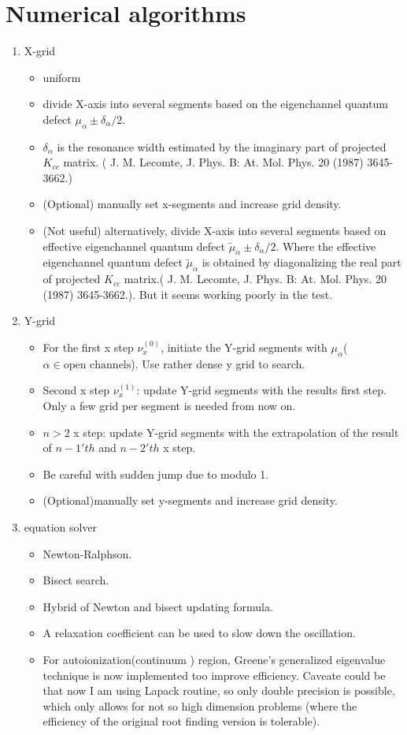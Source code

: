 \documentclass[11pt]{article}
\begin{document}
\section{\label{sec:numerical}Numerical algorithms}
\begin{enumerate}
\item X-grid
\begin{itemize}
	\item uniform 
	\item divide X-axis into several segments based on the eigenchannel quantum defect $\mu_{\alpha}\pm \delta_{\alpha}/2$.
	\item $\delta_{\alpha}$ is the resonance width estimated by the imaginary part of projected $K_{cc}$ matrix. ( J. M. Lecomte, J. Phys. B: At. Mol. Phys. 20 (1987) 3645-3662.) 
	\item (Optional) manually set x-segments and increase grid density.  
	\item (Not useful) alternatively, divide X-axis into several segments based on effective eigenchannel quantum defect  $\tilde{\mu}_{\alpha} \pm \delta_{\alpha}/2$. Where the effective eigenchannel quantum defect  $\tilde{\mu}_{\alpha}$ is obtained by diagonalizing the real part of projected $K_{cc}$ matrix.( J. M. Lecomte, J. Phys. B: At. Mol. Phys. 20 (1987) 3645-3662.). But it seems working poorly in the test.
\end{itemize}
\item Y-grid 
\begin{itemize}
	\item For the first x step $\nu_{x}^{(0)}$, initiate the Y-grid segments with $\mu_{\alpha}$($\alpha \in \text{open channels}$). Use rather dense y grid to search.
	\item Second x step $\nu_{x}^{(1)}$: update Y-grid segments with the results first step. Only a few grid per segment is needed from now on.
	\item $n>2$ x step: update Y-grid segments with the extrapolation of the result of $n-1'th$ and $n-2'th$ x step.
	\item Be careful with sudden jump due to modulo 1.
	\item (Optional)manually set y-segments and increase grid density.
\end{itemize}
\item equation solver
\begin{itemize}
	\item Newton-Ralphson.
	\item Bisect search.
	\item Hybrid of Newton and bisect updating formula.
	\item A relaxation coefficient can be used to slow down the oscillation.
	\item For autoionization(continuum ) region, Greene's generalized eigenvalue technique is now implemented too improve efficiency. Caveate could be that now I am using Lapack routine, so only double precision is possible, which only allows for not so high dimension problems (where the efficiency of the original root finding version is tolerable).
\end{itemize}
\end{enumerate}
\end{document}
